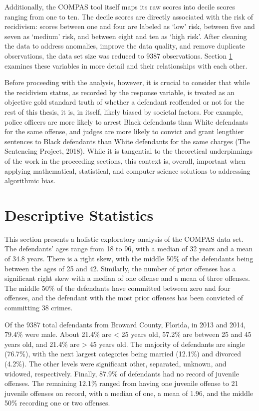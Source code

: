 \documentclass[12pt, twoside]{amherstthesis}
\begin{document}
Additionally, the COMPAS tool itself maps its raw scores into decile scores ranging from one to ten. The decile scores are directly associated with the risk of recidivism: scores between one and four are labeled as `low' risk, between five and seven as `medium' risk, and between eight and ten as `high risk'. After cleaning the data to address anomalies, improve the data quality, and remove duplicate observations, the data set size was reduced to 9387 observations. Section \ref{descriptivestats} examines these variables in more detail and their relationships with each other.

Before proceeding with the analysis, however, it is crucial to consider that while the recidivism status, as recorded by the response variable, is treated as an objective gold standard truth of whether a defendant reoffended or not for the rest of this thesis, it is, in itself, likely biased by societal factors. For example, police officers are more likely to arrest Black defendants than White defendants for the same offense, and judges are more likely to convict and grant lengthier sentences to Black defendants than White defendants for the same charges (The Sentencing Project, 2018). While it is tangential to the theoretical underpinnings of the work in the proceeding sections, this context is, overall, important when applying mathematical, statistical, and computer science solutions to addressing algorithmic bias.

\hypertarget{descriptivestats}{%
\section{Descriptive Statistics}\label{descriptivestats}}

This section presents a holistic exploratory analysis of the COMPAS data set. The defendants' ages range from 18 to 96, with a median of 32 years and a mean of 34.8 years. There is a right skew, with the middle 50\% of the defendants being between the ages of 25 and 42. Similarly, the number of prior offenses has a significant right skew with a median of one offense and a mean of three offenses. The middle 50\% of the defendants have committed between zero and four offenses, and the defendant with the most prior offenses has been convicted of committing 38 crimes.

Of the 9387 total defendants from Broward County, Florida, in 2013 and 2014, 79.4\% were male. About 21.4\% are \textless{} 25 years old, 57.2\% are between 25 and 45 years old, and
21.4\% are \textgreater{} 45 years old. The majority of defendants are single (76.7\%), with the next largest categories being married (12.1\%) and divorced (4.2\%). The other levels were significant other, separated, unknown, and widowed, respectively. Finally, 87.9\% of defendants had no record of juvenile offenses. The remaining 12.1\% ranged from having one juvenile offense to 21 juvenile offenses on record, with a median of one, a mean of 1.96, and the middle 50\% recording one or two offenses.
\end{document}
